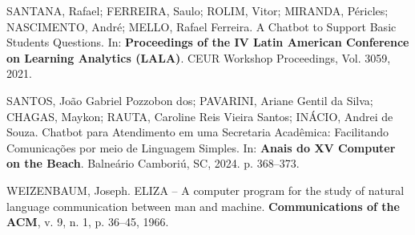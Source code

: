 \documentclass[12pt]{article}
\begin{document}
SANTANA, Rafael; FERREIRA, Saulo; ROLIM, Vitor; MIRANDA, Péricles;
NASCIMENTO, André; MELLO, Rafael Ferreira. A Chatbot to Support Basic
Students Questions. In: \textbf{Proceedings of the IV Latin American
Conference on Learning Analytics (LALA)}. CEUR Workshop Proceedings, Vol.
3059, 2021.

SANTOS, João Gabriel Pozzobon dos; PAVARINI, Ariane Gentil da Silva;
CHAGAS, Maykon; RAUTA, Caroline Reis Vieira Santos; INÁCIO, Andrei de
Souza. Chatbot para Atendimento em uma Secretaria Acadêmica: Facilitando
Comunicações por meio de Linguagem Simples. In: \textbf{Anais do XV
Computer on the Beach}. Balneário Camboriú, SC, 2024. p. 368--373.

WEIZENBAUM, Joseph. ELIZA -- A computer program for the study of natural
language communication between man and machine. \textbf{Communications of
the ACM}, v. 9, n. 1, p. 36--45, 1966.
\end{document}

